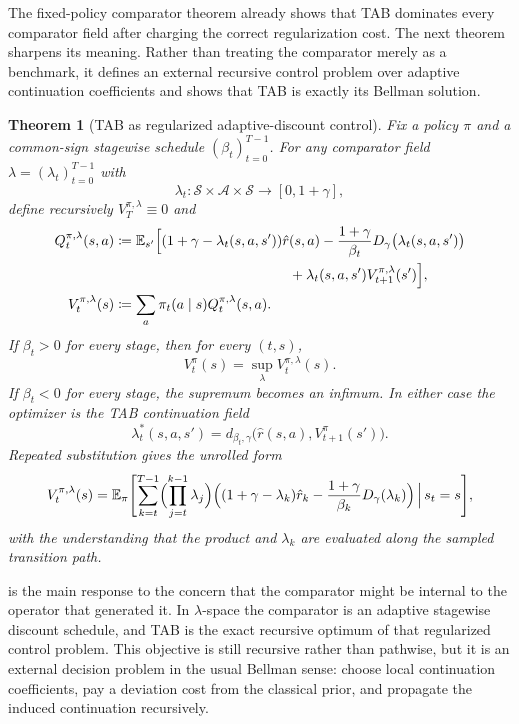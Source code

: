 \documentclass{article}
\newtheorem{theorem}{Theorem}[section]
\theoremstyle{remark}
\newcommand{\E}{\mathbb{E}}
\newcommand{\defeq}{\coloneqq}
\newcommand{\cS}{\mathcal{S}}
\newcommand{\cA}{\mathcal{A}}
\begin{document}
The fixed-policy comparator theorem already shows that TAB dominates every comparator field after charging the correct regularization cost. The next theorem sharpens its meaning. Rather than treating the comparator merely as a benchmark, it defines an external recursive control problem over adaptive continuation coefficients and shows that TAB is exactly its Bellman solution.

\begin{theorem}[TAB as regularized adaptive-discount control]
\label{thm:adaptive-discount-control}
Fix a policy $\pi$ and a common-sign stagewise schedule $(\beta_t)_{t=0}^{T-1}$. For any comparator field $\lambda=(\lambda_t)_{t=0}^{T-1}$ with
\[
\lambda_t:\cS\times\cA\times\cS\to[0,1+\gamma],
\]
define recursively $V_T^{\pi,\lambda}\equiv 0$ and
\begin{align}
Q_t^{\pi,\lambda}(s,a)
&\defeq
\E_{s'}\Bigl[
(1+\gamma-\lambda_t(s,a,s'))\hat r(s,a)
-\frac{1+\gamma}{\beta_t}D_\gamma\bigl(\lambda_t(s,a,s')\bigr) \\
&\hspace{12.5em}
+\lambda_t(s,a,s')V_{t+1}^{\pi,\lambda}(s')
\Bigr],
\label{eq:adaptive-discount-q}\\
V_t^{\pi,\lambda}(s)
&\defeq
\sum_a \pi_t(a\mid s)Q_t^{\pi,\lambda}(s,a).
\label{eq:adaptive-discount-v}
\end{align}
If $\beta_t>0$ for every stage, then for every $(t,s)$,
\begin{equation}
V_t^{\pi}(s)=\sup_{\lambda}V_t^{\pi,\lambda}(s).
\label{eq:adaptive-discount-control}
\end{equation}
If $\beta_t<0$ for every stage, the supremum becomes an infimum. In either case the optimizer is the TAB continuation field
\[
\lambda_t^*(s,a,s')=d_{\beta_t,\gamma}\bigl(\hat r(s,a),V_{t+1}^{\pi}(s')\bigr).
\]
Repeated substitution gives the unrolled form
\begin{equation}
V_t^{\pi,\lambda}(s)
=
\E_\pi\Biggl[
\sum_{k=t}^{T-1}
\Bigl(\prod_{j=t}^{k-1}\lambda_j\Bigr)
\Bigl(
(1+\gamma-\lambda_k)\hat r_k
-
\frac{1+\gamma}{\beta_k}D_\gamma(\lambda_k)
\Bigr)
\,\Big|\, s_t=s
\Biggr],
\label{eq:adaptive-discount-unrolled}
\end{equation}
with the understanding that the product and $\lambda_k$ are evaluated along the sampled transition path.
\end{theorem}

 is the main response to the concern that the comparator might be internal to the operator that generated it. In $\lambda$-space the comparator is an adaptive stagewise discount schedule, and TAB is the exact recursive optimum of that regularized control problem. This objective is still recursive rather than pathwise, but it is an external decision problem in the usual Bellman sense: choose local continuation coefficients, pay a deviation cost from the classical prior, and propagate the induced continuation recursively.
\end{document}
